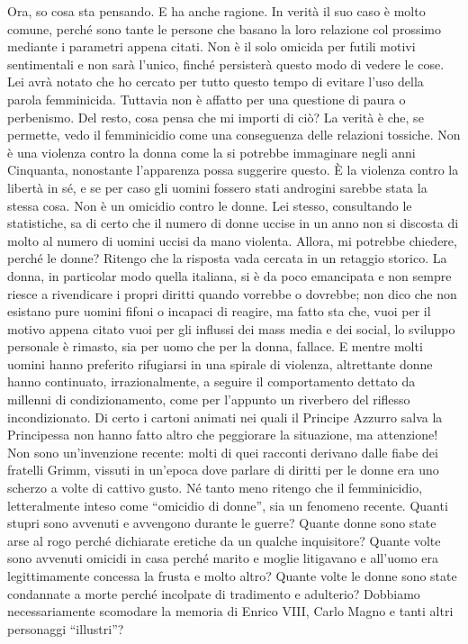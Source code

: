 \documentclass[a4paper,12pt]{article}
\begin{document}
\begin{dialogue}
Ora, so cosa sta pensando. E ha anche ragione. In verità il suo caso è molto comune, perché sono tante le persone che basano la loro relazione col prossimo mediante i parametri appena citati. Non è il solo omicida per futili motivi sentimentali e non sarà l’unico, finché persisterà questo modo di vedere le cose. Lei avrà notato che ho cercato per tutto questo tempo di evitare l’uso della parola femminicida. Tuttavia non è affatto per una questione di paura o perbenismo. Del resto, cosa pensa che mi importi di ciò? La verità è che, se permette, vedo il femminicidio come una conseguenza delle relazioni tossiche. Non è una violenza contro la donna come la si potrebbe immaginare negli anni Cinquanta, nonostante l’apparenza possa suggerire questo. È la violenza contro la libertà in sé, e se per caso gli uomini fossero stati androgini sarebbe stata la stessa cosa. Non è un omicidio contro le donne. Lei stesso, consultando le statistiche, sa di certo che il numero di donne uccise in un anno non si discosta di molto al numero di uomini uccisi da mano violenta. Allora, mi potrebbe chiedere, perché le donne? Ritengo che la risposta vada cercata in un retaggio storico. La donna, in particolar modo quella italiana, si è da poco emancipata e non sempre riesce a rivendicare i propri diritti quando vorrebbe o dovrebbe; non dico che non esistano pure uomini fifoni o incapaci di reagire, ma fatto sta che, vuoi per il motivo appena citato vuoi per gli influssi dei mass media e dei social, lo sviluppo personale è rimasto, sia per uomo che per la donna, fallace. E mentre molti uomini hanno preferito rifugiarsi in una spirale di violenza, altrettante donne hanno continuato, irrazionalmente, a seguire il comportamento dettato da millenni di condizionamento, come per l’appunto un riverbero del riflesso incondizionato. Di certo i cartoni animati nei quali il Principe Azzurro salva la Principessa non hanno fatto altro che peggiorare la situazione, ma attenzione! Non sono un’invenzione recente: molti di quei racconti derivano dalle fiabe dei fratelli Grimm, vissuti in un’epoca dove parlare di diritti per le donne era uno scherzo a volte di cattivo gusto. Né tanto meno ritengo che il femminicidio, letteralmente inteso come “omicidio di donne”, sia un fenomeno recente. Quanti stupri sono avvenuti e avvengono durante le guerre? Quante donne sono state arse al rogo perché dichiarate eretiche da un qualche inquisitore? Quante volte sono avvenuti omicidi in casa perché marito e moglie litigavano e all’uomo era legittimamente concessa la frusta e molto altro? Quante volte le donne sono state condannate a morte perché incolpate di tradimento e adulterio? Dobbiamo necessariamente scomodare la memoria di Enrico VIII, Carlo Magno e tanti altri personaggi “illustri”? 

\end{dialogue}
\end{document}
